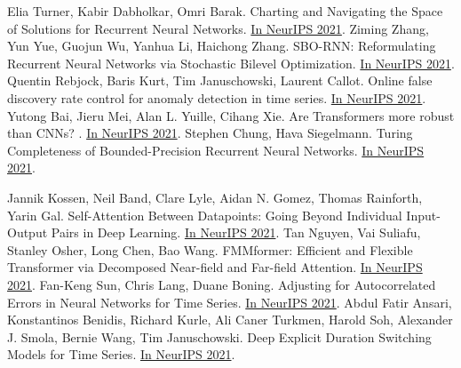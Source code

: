 \documentclass[b5paper,xelatex,ja=standard,10pt]{bxjsarticle}
\begin{document}
\begin{thebibliography}{99}
     Elia Turner, Kabir Dabholkar, Omri Barak. Charting and Navigating the Space of Solutions for Recurrent Neural Networks. {\href{https://proceedings.neurips.cc/paper/2021/hash/d530d454337fb09964237fecb4bea6ce-Abstract.html}{In NeurIPS 2021}}.
     Ziming Zhang, Yun Yue, Guojun Wu, Yanhua Li, Haichong Zhang. SBO-RNN: Reformulating Recurrent Neural Networks via Stochastic Bilevel Optimization. {\href{https://proceedings.neurips.cc/paper/2021/hash/d87ca511e2a8593c8039ef732f5bffed-Abstract.html}{In NeurIPS 2021}}.
     Quentin Rebjock, Baris Kurt, Tim Januschowski, Laurent Callot. Online false discovery rate control for anomaly detection in time series. {\href{https://proceedings.neurips.cc/paper/2021/hash/def130d0b67eb38b7a8f4e7121ed432c-Abstract.html}{In NeurIPS 2021}}.
     Yutong Bai, Jieru Mei, Alan L. Yuille, Cihang Xie. Are Transformers more robust than CNNs? . {\href{https://proceedings.neurips.cc/paper/2021/hash/e19347e1c3ca0c0b97de5fb3b690855a-Abstract.html}{In NeurIPS 2021}}.
     Stephen Chung, Hava Siegelmann. Turing Completeness of Bounded-Precision Recurrent Neural Networks. {\href{https://proceedings.neurips.cc/paper/2021/hash/ef452c63f81d0105dd4486f775adec81-Abstract.html}{In NeurIPS 2021}}.

     Jannik Kossen, Neil Band, Clare Lyle, Aidan N. Gomez, Thomas Rainforth, Yarin Gal. Self-Attention Between Datapoints: Going Beyond Individual Input-Output Pairs in Deep Learning. {\href{https://proceedings.neurips.cc/paper/2021/hash/f1507aba9fc82ffa7cc7373c58f8a613-Abstract.html}{In NeurIPS 2021}}.
     Tan Nguyen, Vai Suliafu, Stanley Osher, Long Chen, Bao Wang. FMMformer: Efficient and Flexible Transformer via Decomposed Near-field and Far-field Attention. {\href{https://proceedings.neurips.cc/paper/2021/hash/f621585df244e9596dc70a39b579efb1-Abstract.html}{In NeurIPS 2021}}.
     Fan-Keng Sun, Chris Lang, Duane Boning. Adjusting for Autocorrelated Errors in Neural Networks for Time Series. {\href{https://proceedings.neurips.cc/paper/2021/hash/f8e6ba1db0f3c4054afec1684ba8fb26-Abstract.html}{In NeurIPS 2021}}.
     Abdul Fatir Ansari, Konstantinos Benidis, Richard Kurle, Ali Caner Turkmen, Harold Soh, Alexander J. Smola, Bernie Wang, Tim Januschowski. Deep Explicit Duration Switching Models for Time Series. {\href{https://proceedings.neurips.cc/paper/2021/hash/fb4c835feb0a65cc39739320d7a51c02-Abstract.html}{In NeurIPS 2021}}.
\end{thebibliography}
\end{document}
